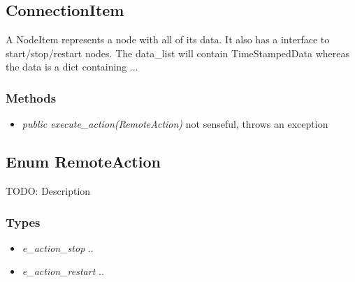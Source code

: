 \subsection{ConnectionItem}
 A NodeItem represents a node with all of its data. It also has a interface to start/stop/restart nodes.
 The data\_list will contain TimeStampedData whereas the data is a dict containing ...
\subsubsection{Methods}
\begin{itemize}
  \item \textit{public execute\_action(RemoteAction)} not senseful, throws an exception
\end{itemize}


\subsection{Enum RemoteAction}
TODO: Description
\subsubsection{Types}
\begin{itemize}
	\item \textit{e\_action\_stop}
	..
	\item \textit{e\_action\_restart}
	..
\end{itemize}

